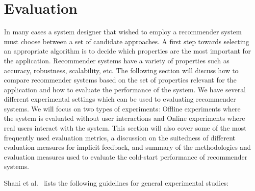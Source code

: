 
\label{evaluation}
\section{Evaluation}




In many cases a system designer that wished to employ a recommender system must
choose between a set of candidate approaches. A first step towards selecting an
appropriate algorithm is to decide which properties are the most important for
the application. Recommender systems have a variety of properties such as
accuracy, robustness, scalability, etc. The following section will discuss how
to compare recommender systems based on the set of properties  relevant for the
application and how to evaluate the performance of the system. We have several
different experimental settings which can be used to evaluating recommender systems.
We will focus on two types of experiments:
Offline experiments where the system is evaluated without user interactions and
Online experiments where real users interact with the system. This section will
also cover some of the most frequently used evaluation metrics, a discussion on
the suitedness of different evaluation measures for implicit feedback, and
summary of the methodologies and evaluation measures used to evaluate the
cold-start performance of recommender systems.

Shani et al.\ \cite{Shani2011} lists the following guidelines for general
experimental studies:

